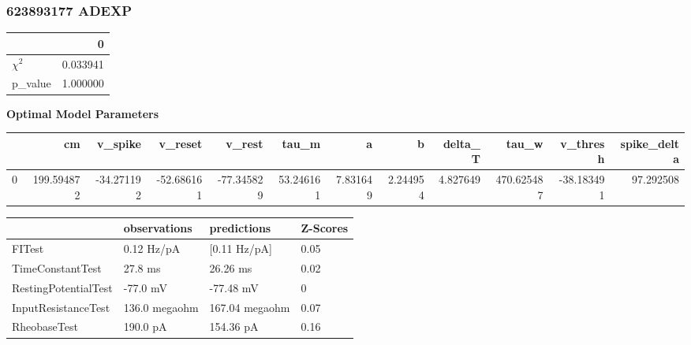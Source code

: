 \subsubsection{623893177 ADEXP}\begin{tabular}{lr}
\toprule
{} &         0 \\
\midrule
$\chi^{2}$ &  0.033941 \\
p\_value    &  1.000000 \\
\bottomrule
\end{tabular}
\textbf{Optimal Model Parameters} \begin{tabular}{lrrrrrrrrrrr}
\toprule
{} &          cm &    v\_spike &    v\_reset &     v\_rest &      tau\_m &         a &         b &   delta\_T &       tau\_w &   v\_thresh &  spike\_delta \\
\midrule
0 &  199.594872 & -34.271192 & -52.686161 & -77.345829 &  53.246161 &  7.831649 &  2.244954 &  4.827649 &  470.625487 & -38.183491 &    97.292508 \\
\bottomrule
\end{tabular}
\begin{tabular}{llll}
\toprule
{} &   observations &     predictions & Z-Scores \\
\midrule
FITest               &     0.12 Hz/pA &    [0.11 Hz/pA] &     0.05 \\
TimeConstantTest     &        27.8 ms &        26.26 ms &     0.02 \\
RestingPotentialTest &       -77.0 mV &       -77.48 mV &        0 \\
InputResistanceTest  &  136.0 megaohm &  167.04 megaohm &     0.07 \\
RheobaseTest         &       190.0 pA &       154.36 pA &     0.16 \\
\bottomrule
\end{tabular}
